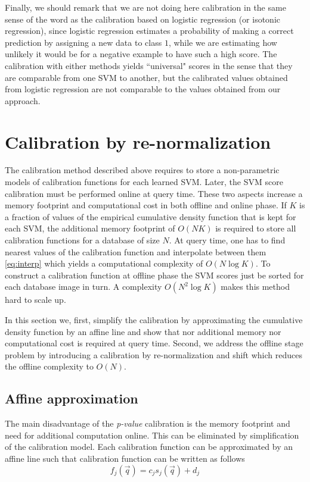       Finally, we should remark that we are not doing here calibration in the same sense of the word as the calibration based on logistic regression (or isotonic regression), since logistic regression estimates a probability of making a correct prediction by assigning a new data to class $1$, while we are estimating how unlikely it would be for a negative example to have such a high score. The calibration with either methods yields ``universal" scores in the sense that they are comparable from one SVM to another, but the calibrated values obtained from logistic regression are not comparable to the values obtained from our approach.

\section{Calibration by re-normalization}
\label{sec:calibrationRenorm}
  The calibration method described above requires to store a non-parametric models of calibration functions for each learned SVM. Later, the SVM score calibration must be performed online at query time. These two aspects increase a memory footprint and computational cost in both offline and online phase. If $K$ is a fraction of values of the empirical cumulative density function that is kept for each SVM, the additional memory footprint of $O(NK)$ is required to store all calibration functions for a database of size $N$. At query time, one has to find nearest values of the calibration function and interpolate between them \eqref{eq:interp} which yields a computational complexity of $O(N \log{K})$. To construct a calibration function at offline phase the SVM scores just be sorted for each database image in turn. A complexity $O(N^2 \log{K})$ makes this method hard to scale up.

  In this section we, first, simplify the calibration by approximating the cumulative density function by an affine line and show that nor additional memory nor computational cost is required at query time. Second, we address the offline stage problem by introducing a calibration by re-normalization and shift which reduces the offline complexity to $O(N)$.

   \subsection{Affine approximation}
     The main disadvantage of the \emph{p-value} calibration is the memory footprint and need for additional computation online. This can be eliminated by simplification of the calibration model. Each calibration function can be approximated by an affine line such that calibration function can be written as follows
     \begin{equation}
       f_j(\vec{q}) = c_j s_j(\vec{q}) + d_j
       \label{eq:affine}
     \end{equation}

